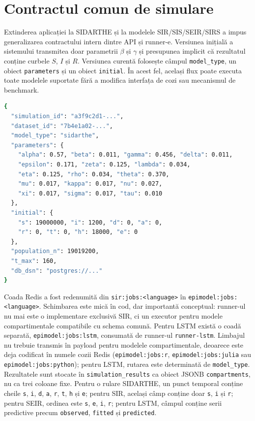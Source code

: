 \section{Contractul comun de simulare}
\label{sec:contract_simulare}

Extinderea aplicației la SIDARTHE și la modelele SIR/SIS/SEIR/SIRS a impus
generalizarea contractului intern dintre API și runner-e. Versiunea inițială a
sistemului transmitea doar parametrii $\beta$ și $\gamma$ și presupunea implicit
că rezultatul conține curbele $S$, $I$ și $R$. Versiunea curentă folosește
câmpul \texttt{model\_type}, un obiect \texttt{parameters} și un obiect
\texttt{initial}. În acest fel, același flux poate executa toate modelele
suportate fără a modifica interfața de cozi sau mecanismul de benchmark.

\begin{lstlisting}[language=bash, caption={Structura job-ului publicat în Redis pentru o simulare SIDARTHE.}]
{
  "simulation_id": "a3f9c2d1-...",
  "dataset_id": "7b4e1a02-...",
  "model_type": "sidarthe",
  "parameters": {
    "alpha": 0.57, "beta": 0.011, "gamma": 0.456, "delta": 0.011,
    "epsilon": 0.171, "zeta": 0.125, "lambda": 0.034,
    "eta": 0.125, "rho": 0.034, "theta": 0.370,
    "mu": 0.017, "kappa": 0.017, "nu": 0.027,
    "xi": 0.017, "sigma": 0.017, "tau": 0.010
  },
  "initial": {
    "s": 19000000, "i": 1200, "d": 0, "a": 0,
    "r": 0, "t": 0, "h": 18000, "e": 0
  },
  "population_n": 19019200,
  "t_max": 160,
  "db_dsn": "postgres://..."
}
\end{lstlisting}

Coada Redis a fost redenumită din \texttt{sir:jobs:<language>} în
\texttt{epimodel:jobs:<language>}. Schimbarea este mică în cod, dar importantă
conceptual: runner-ul nu mai este o implementare exclusivă SIR, ci un executor
pentru modele compartimentale compatibile cu schema comună. Pentru LSTM există
o coadă separată, \texttt{epimodel:jobs:lstm}, consumată de runner-ul
\texttt{runner-lstm}. Limbajul nu trebuie transmis în payload pentru modelele
compartimentale, deoarece este deja codificat în numele cozii Redis
(\texttt{epimodel:jobs:r}, \texttt{epimodel:jobs:julia} sau
\texttt{epimodel:jobs:python}); pentru LSTM, rutarea este determinată de
\texttt{model\_type}. Rezultatele sunt stocate în
\texttt{simulation\_results} ca obiect JSONB \texttt{compartments},
nu ca trei coloane fixe. Pentru o rulare SIDARTHE, un punct temporal conține
cheile \texttt{s}, \texttt{i}, \texttt{d}, \texttt{a}, \texttt{r}, \texttt{t},
\texttt{h} și \texttt{e}; pentru SIR, același câmp conține doar
\texttt{s}, \texttt{i} și \texttt{r}; pentru SEIR, ordinea este
\texttt{s}, \texttt{e}, \texttt{i}, \texttt{r}; pentru LSTM, câmpul conține
serii predictive precum \texttt{observed}, \texttt{fitted} și
\texttt{predicted}.

